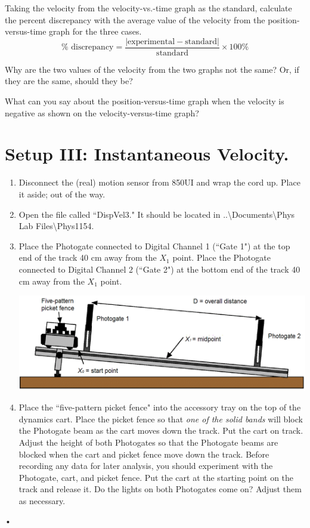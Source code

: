 \documentclass[main.tex]{subfiles}
\begin{document}
\begin{question}
Taking the velocity from the velocity-vs.-time graph as the standard, calculate the percent discrepancy with the average value of the velocity from the position-versus-time graph for the three cases. 
\[
\%\text{ discrepancy} = \frac{|\text{experimental}-\text{standard}|}{\text{standard}}\times 100\%
\]
\end{question}
\begin{question}
Why are the two values of the velocity from the two graphs not the same? Or, if they are the same, should they be?
\end{question}
\begin{question}
What can you say about the position-versus-time graph when the velocity is negative as shown on the velocity-versus-time graph?
\end{question}

\section{Setup III: Instantaneous Velocity.}
\begin{enumerate}
\item
Disconnect the (real) motion sensor from 850UI and wrap the cord up. Place it aside; out of the way.
\item
Open the file called ``DispVel3." It should be located in ..\textbackslash Documents\textbackslash Phys Lab Files\textbackslash Phys1154.
\item
Place the Photogate connected to Digital Channel 1 (``Gate 1") at the top end of the track 40 cm away from the $X_1$ point. Place the Photogate connected to Digital Channel 2 (``Gate 2") at the bottom end of the track 40 cm away from the $X_1$ point.

\includegraphics[width=\textwidth]{Disp-Vel_III_Setup}

\item
Place the ``five-pattern picket fence" into the accessory tray on the top of the dynamics cart. Place the picket fence so that \emph{one of the solid bands} will block the Photogate beam as the cart moves down the track. Put the cart on track. Adjust the height of both Photogates so that the Photogate beams are blocked when the cart and picket fence move down the track. Before recording any data for later analysis, you should experiment with the Photogate, cart, and picket fence. Put the cart at the starting point on the track and release it. Do the lights on both Photogates come on? Adjust them as necessary.
\end{enumerate}•
\end{document}
